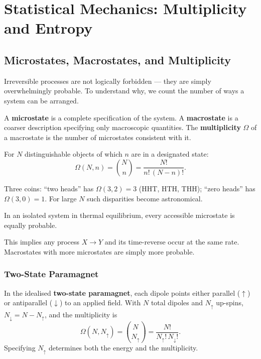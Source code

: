 \chapter{Statistical Mechanics: Multiplicity and Entropy}

\section{Microstates, Macrostates, and Multiplicity}

Irreversible processes are not logically forbidden --- they are simply overwhelmingly probable. To understand why, we count the number of ways a system can be arranged.

\begin{definition}
A \textbf{microstate} is a complete specification of the system. A \textbf{macrostate} is a coarser description specifying only macroscopic quantities. The \textbf{multiplicity} $\Omega$ of a macrostate is the number of microstates consistent with it.
\end{definition}

For $N$ distinguishable objects of which $n$ are in a designated state:
\[
    \Omega(N, n) = \binom{N}{n} = \frac{N!}{n!\,(N-n)!}.
\]

\begin{example}
Three coins: ``two heads'' has $\Omega(3,2) = 3$ (HHT, HTH, THH); ``zero heads'' has $\Omega(3,0) = 1$. For large $N$ such disparities become astronomical.
\end{example}

\begin{definition}
In an isolated system in thermal equilibrium, every accessible microstate is equally probable.
\end{definition}

This implies any process $X \to Y$ and its time-reverse occur at the same rate. Macrostates with more microstates are simply more probable.

\subsection{Two-State Paramagnet}

In the idealised \textbf{two-state paramagnet}, each dipole points either parallel ($\uparrow$) or antiparallel ($\downarrow$) to an applied field. With $N$ total dipoles and $N_\uparrow$ up-spins, $N_\downarrow = N - N_\uparrow$, and the multiplicity is
\[
    \Omega(N, N_\uparrow) = \binom{N}{N_\uparrow} = \frac{N!}{N_\uparrow!\, N_\downarrow!}.
\]
Specifying $N_\uparrow$ determines both the energy and the multiplicity.

